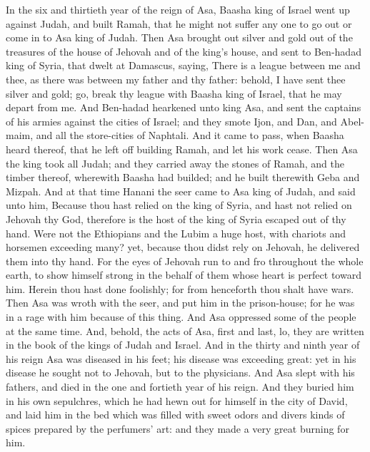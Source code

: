 In the six and thirtieth year of the reign of Asa, Baasha king of Israel went up against Judah, and built Ramah, that he might not suffer any one to go out or come in to Asa king of Judah. Then Asa brought out silver and gold out of the treasures of the house of Jehovah and of the king’s house, and sent to Ben-hadad king of Syria, that dwelt at Damascus, saying, There is a league between me and thee, as there was between my father and thy father: behold, I have sent thee silver and gold; go, break thy league with Baasha king of Israel, that he may depart from me. And Ben-hadad hearkened unto king Asa, and sent the captains of his armies against the cities of Israel; and they smote Ijon, and Dan, and Abel-maim, and all the store-cities of Naphtali. And it came to pass, when Baasha heard thereof, that he left off building Ramah, and let his work cease. Then Asa the king took all Judah; and they carried away the stones of Ramah, and the timber thereof, wherewith Baasha had builded; and he built therewith Geba and Mizpah.  And at that time Hanani the seer came to Asa king of Judah, and said unto him, Because thou hast relied on the king of Syria, and hast not relied on Jehovah thy God, therefore is the host of the king of Syria escaped out of thy hand. Were not the Ethiopians and the Lubim a huge host, with chariots and horsemen exceeding many? yet, because thou didst rely on Jehovah, he delivered them into thy hand. For the eyes of Jehovah run to and fro throughout the whole earth, to show himself strong in the behalf of them whose heart is perfect toward him. Herein thou hast done foolishly; for from henceforth thou shalt have wars. Then Asa was wroth with the seer, and put him in the prison-house; for he was in a rage with him because of this thing. And Asa oppressed some of the people at the same time.  And, behold, the acts of Asa, first and last, lo, they are written in the book of the kings of Judah and Israel. And in the thirty and ninth year of his reign Asa was diseased in his feet; his disease was exceeding great: yet in his disease he sought not to Jehovah, but to the physicians. And Asa slept with his fathers, and died in the one and fortieth year of his reign. And they buried him in his own sepulchres, which he had hewn out for himself in the city of David, and laid him in the bed which was filled with sweet odors and divers kinds of spices prepared by the perfumers’ art: and they made a very great burning for him. 

